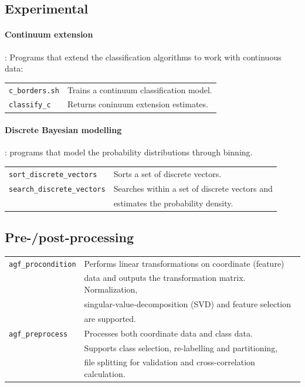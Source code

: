 \documentclass[12pt]{article}
\begin{document}
\subsection{Experimental}

\paragraph{Continuum extension}:
Programs that extend the classification algorithms to work with continuous data:

\begin{tabular}{ll}
  \verb/c_borders.sh/ & Trains a continuum classification model.\\
  \verb/classify_c/ & Returns coninuum extension estimates.\\
\end{tabular}

\paragraph{Discrete Bayesian modelling}: programs that model the probability distributions through binning.

\begin{tabular}{ll}
  \verb/sort_discrete_vectors/ & Sorts a set of discrete vectors.\\
  \verb/search_discrete_vectors/ & Searches within a set of discrete vectors and\\
		& estimates the probability density.
\end{tabular}

\subsection{Pre-/post-processing}

\begin{tabular}{ll}
\verb/agf_procondition/ & Performs linear transformations on coordinate (feature)\\
 & data and outputs the transformation matrix.  Normalization, \\
 & singular-value-decomposition (SVD) and feature selection \\
 & are supported.\\
\verb/agf_preprocess/ & Processes both coordinate data and class data.  \\
 & Supports class selection, re-labelling and partitioning, \\
 & file splitting for validation and cross-correlation calculation.
\end{tabular}
\end{document}
